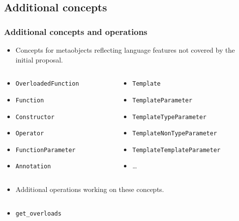 \documentclass[compress,table,xcolor=table]{beamer}
\begin{document}
\subsection{Additional concepts}
\begin{frame}
\frametitle{Additional concepts and operations}
  \begin{itemize}
    \small
    \item Concepts for metaobjects reflecting language features not covered
    by the initial proposal.
  \end{itemize}
  \begin{columns}
    \scriptsize
    \begin{column}{0.35\textwidth}
      \begin{itemize}
      \item \texttt{OverloadedFunction}
      \item \texttt{Function}
      \item \texttt{Constructor}
      \item \texttt{Operator}
      \item \texttt{FunctionParameter}
      \item \texttt{Annotation}
      \end{itemize}
    \end{column}
    \begin{column}{0.40\textwidth}
      \begin{itemize}
      \item \texttt{Template}
      \item \texttt{TemplateParameter}
      \item \texttt{TemplateTypeParameter}
      \item \texttt{TemplateNonTypeParameter}
      \item \texttt{TemplateTemplateParameter}
      \item \ldots
      \end{itemize}
    \end{column}
  \end{columns}
  \begin{itemize}
    \small
    \item Additional operations working on these concepts.
  \end{itemize}
  \begin{columns}
    \scriptsize
    \begin{column}{0.45\textwidth}
      \begin{itemize}
      \item \texttt{get\_overloads}

\end{itemize}
\end{column}
\end{columns}
\end{frame}
\end{document}
